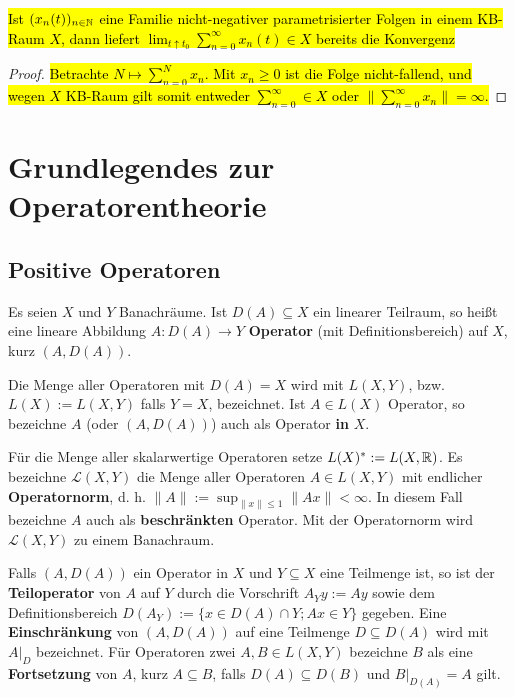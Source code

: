 \begin{folg}\label{Monotone Konvergenz in KB-Raum}
\hl{Ist $(x_n(t))_{n\in\mathbb{N}}$ eine Familie nicht-negativer parametrisierter Folgen in einem KB-Raum $X$, dann liefert $\lim_{t\uparrow t_0}\sum_{n=0}^\infty x_n(t)\in X$ bereits die Konvergenz}
\end{folg}

\begin{proof}
\hl{Betrachte $N\mapsto \sum_{n=0}^N x_n$. Mit $x_n\geq 0$ ist die Folge nicht-fallend, und wegen $X$ KB-Raum gilt somit entweder $\sum_{n=0}^\infty\in X$ oder $\|\sum_{n=0}^\infty x_n\| = \infty$. }
\end{proof}


\chapter{Grundlegendes zur Operatorentheorie}

\section{Positive Operatoren}

Es seien $X$ und $Y$ Banachräume. Ist $D(A)\subseteq X$ ein linearer Teilraum, so heißt eine lineare Abbildung $A\colon D(A)\to Y$  \textbf{Operator} (mit Definitionsbereich) auf $X$, kurz $(A, D(A))$.
\par
Die Menge aller Operatoren mit $D(A)=X$ wird mit $L(X, Y)$, bzw. $L(X):= L(X,Y)$ falls $Y=X$, bezeichnet. Ist $A\in L(X)$ Operator, so bezeichne $A$ (oder $(A, D(A))$) auch als Operator \textbf{in} $X$. 
\par
Für die Menge aller skalarwertige Operatoren setze $L(X)^*:= L(X,\mathbb{R})$. Es bezeichne $\mathcal L(X,Y)$ die Menge aller  Operatoren $A\in L(X,Y)$ mit endlicher  \textbf{Operatornorm}, d. h. $\|A\|:=\sup_{\|x\|\leq 1}\|Ax\|<\infty$. In diesem Fall bezeichne $A$ auch als  \textbf{beschränkten} Operator. Mit der Operatornorm wird $\mathcal L(X,Y)$ zu einem Banachraum.
\par
Falls $(A, D(A))$ ein Operator in $X$ und $Y\subseteq X$ eine Teilmenge ist, so ist der \textbf{Teiloperator} von $A$ auf $Y$ durch die Vorschrift $A_Yy := Ay$ sowie dem Definitionsbereich $D(A_Y):=\{x\in D(A)\cap Y; Ax\in Y\}$ gegeben. Eine \textbf{Einschränkung} von $(A, D(A))$ auf eine Teilmenge $D\subseteq D(A)$ wird mit $A|_D$ bezeichnet. Für Operatoren zwei $A, B\in L(X,Y)$ bezeichne $B$ als eine \textbf{Fortsetzung} von $A$, kurz $A\subseteq B$, falls $D(A)\subseteq D(B)$ und $B|_{D(A)}=A$ gilt.


